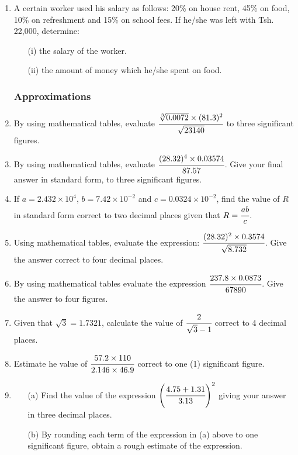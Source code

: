 \begin{enumerate}
	\item A certain worker used his salary as follows: 20\% on house rent, 45\% on food, 10\% on refreshment and 15\% on school fees. If he\slash she was left with Tsh. 22,000, determine:
		\begin{itemize}
		\item[(i)] the salary of the worker.
		\item[(ii)] the amount of money which he\slash she spent on food.
		\end{itemize}

		\subsubsection{Approximations}	
	\item By using mathematical tables, evaluate $\cfrac{\sqrt[3]{0.0072} \times (81.3)^2}{\sqrt{23140}}$ to three significant figures.
	
	\item By using mathematical tables, evaluate $\cfrac{(28.32)^4 \times 0.03574}{87.57}$. Give your final answer in standard form, to three significant figures.
	
	\item If $a = 2.432 \times 10^4$, $b = 7.42 \times 10^{-2}$ and $c = 0.0324 \times 10^{-2}$, find the value of $R$ in standard form correct to two decimal places given that $R = \cfrac{ab}{c}$.
	
	\item Using mathematical tables, evaluate the expression: $\cfrac{(28.32)^2 \times 0.3574}{\sqrt{8.732}}$. Give the answer correct to four decimal places.
	 
	 \item By using mathematical tables evaluate the expression $\cfrac{237.8 \times 0.0873}{67890}$. Give the answer to four figures.
	 
	 \item Given that $\sqrt{3} = 1.7321$, calculate the value of $\cfrac{2}{\sqrt{3} - 1}$ correct to 4 decimal places.

	\item Estimate he value of $\cfrac{57.2 \times 110}{2.146 \times 46.9}$ correct to one (1) significant figure.
	 
	 \item 
	 	\begin{itemize}
	 	\item[(a)] Find the value of the expression $\left(\cfrac{4.75 + 1.31}{3.13}\right)^2$ giving your answer in three decimal places.
	 	\item[(b)] By rounding each term of the expression in (a) above to one significant figure, obtain a rough estimate of the expression.
	 	\end{itemize}
	 

\end{enumerate}
